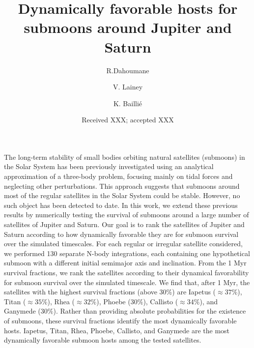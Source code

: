 \documentclass{aa}
\begin{document}
 


   \title{Dynamically favorable hosts for submoons around Jupiter and Saturn}

   \author{R.Dahoumane
          \and
         V. Lainey
         \and
         K. Baillié
          }


   \date{Received XXX; accepted XXX}

 
  \abstract
   {The long-term stability of small bodies orbiting natural satellites (submoons) in the Solar System has been previously investigated using an analytical approximation of a three-body problem, focusing mainly on tidal forces and neglecting other perturbations. This approach suggests that submoons around most of the regular satellites in the Solar System could be stable. However, no such object has been detected to date.}
   {In this work, we extend these previous results by numerically testing the survival of submoons around a large number of satellites of Jupiter and Saturn. Our goal is to rank the satellites of Jupiter and Saturn according to how dynamically favorable they are for submoon survival over the simulated timescales.}
   {For each regular or irregular satellite considered, we performed 130 separate N-body integrations, each containing one hypothetical submoon with a different initial semimajor axis and inclination. From the 1 Myr survival fractions, we rank the satellites according to their dynamical favorability for submoon survival over the simulated timescale.}
   {We find that, after 1 Myr, the satellites with the highest survival fractions (above 30\%) are Iapetus ($\approx 37\%$), Titan ($\approx 35\%$), Rhea ($\approx 32\%$), Phoebe ($30\%$), Callisto ($\approx 34\%$), and Ganymede ($30\%$).}
   {Rather than providing absolute probabilities for the existence of submoons, these survival fractions identify the most dynamically favorable hosts. Iapetus, Titan, Rhea, Phoebe, Callisto, and Ganymede are the most dynamically favorable submoon hosts among the tested satellites.}
\end{document}
